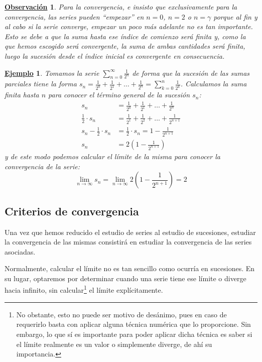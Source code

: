 \documentclass[10pt,a4paper,openright]{book}
\theoremstyle{break}
\newtheorem{obs}{\underline{Observación}}[chapter]
\newtheorem{ej}{\underline{Ejemplo}}[chapter]
\begin{document}
\begin{obs}
Para la convergencia, e insisto que exclusivamente para la convergencia, las series pueden ``empezar'' en $n=0$, $n=2$ o $n=\gamma$ porque al fin y al cabo si la serie converge, empezar un poco más adelante no es tan importante. Esto se debe a que la suma hasta ese índice de comienzo será finita y, como la que hemos escogido será convergente, la suma de ambas cantidades será finita, luego la sucesión desde el índice inicial es convergente en consecuencia.
\end{obs}

\begin{ej}
Tomamos la serie $ \displaystyle \sum_{n=0}^{\infty} \frac{1}{2^n}$ de forma que la sucesión de las sumas parciales tiene la forma $s_n =\frac{1}{2^0} + \frac{1}{2^1} + \ldots + \frac{1}{2^n} = \sum_{k=0}^{n} \frac{1}{2^k}$. Calculamos la suma finita hasta $n$ para conocer el término general de la sucesión $s_n$:
\begin{align*}
s_n &= \frac{1}{2^0} + \frac{1}{2^1} + \ldots + \frac{1}{2^n} \\
\frac{1}{2}\cdot s_n &= \frac{1}{2^1} + \frac{1}{2^2} + \ldots + \frac{1}{2^{n+1}} \\
s_n - \frac{1}{2}\cdot s_n &= \frac{1}{2}\cdot s_n = 1 - \frac{1}{2^{n+1}} \\
s_n &= 2\left(1 - \frac{1}{2^{n+1}}\right)
\end{align*}
y de este modo podemos calcular el límite de la misma para conocer la convergencia de la serie:
\[
\lim_{n \to \infty} s_n = \lim_{n \to \infty}  2\left(1 - \frac{1}{2^{n+1}}\right) = 2
\]
\end{ej}

\subsection{Criterios de convergencia}
Una vez que hemos reducido el estudio de series al estudio de sucesiones, estudiar la convergencia de las mismas consistirá en estudiar la convergencia de las series asociadas.

Normalmente, calcular el límite no es tan sencillo como ocurría en sucesiones. En su lugar, optaremos por determinar cuando una serie tiene ese límite o diverge hacia infinito, sin calcular\footnote{No obstante, esto no puede ser motivo de desánimo, pues en caso de requerirlo basta con aplicar alguna técnica numérica que lo proporcione. Sin embargo, lo que sí es importante para poder aplicar dicha técnica es saber si el límite realmente es un valor o simplemente diverge, de ahí su importancia.} el límite explícitamente.
\end{document}
